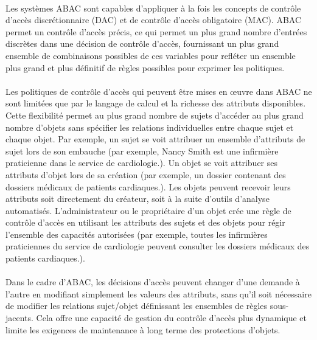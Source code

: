 \label{sectionAvantagesABAC}

\paragraph{} Les systèmes ABAC sont capables d'appliquer à la fois les concepts de contrôle d'accès discrétionnaire (DAC) et de contrôle d'accès obligatoire (MAC). ABAC permet un contrôle d'accès précis, ce qui permet un plus grand nombre d'entrées discrètes dans une décision de contrôle d'accès, fournissant un plus grand ensemble de combinaisons possibles de ces variables pour refléter un ensemble plus grand et plus définitif de règles possibles pour exprimer les politiques.
\paragraph{} Les politiques de contrôle d'accès qui peuvent être mises en œuvre dans ABAC ne sont limitées que par le langage de calcul et la richesse des attributs disponibles. Cette flexibilité permet au plus grand nombre de sujets d'accéder au plus grand nombre d'objets sans spécifier les relations individuelles entre chaque sujet et chaque objet. Par exemple, un sujet se voit attribuer un ensemble d'attributs de sujet lors de son embauche (par exemple, Nancy Smith est une infirmière praticienne dans le service de cardiologie.). Un objet se voit attribuer ses attributs d'objet lors de sa création (par exemple, un dossier contenant des dossiers médicaux de patients cardiaques.). Les objets peuvent recevoir leurs attributs soit directement du créateur, soit à la suite d'outils d'analyse automatisés. L'administrateur ou le propriétaire d'un objet crée une règle de contrôle d'accès en utilisant les attributs des sujets et des objets pour régir l'ensemble des capacités autorisées (par exemple, toutes les infirmières praticiennes du service de cardiologie peuvent consulter les dossiers médicaux des patients cardiaques.). 
\paragraph{} Dans le cadre d'ABAC, les décisions d'accès peuvent changer d'une demande à l'autre en modifiant simplement les valeurs des attributs, sans qu'il soit nécessaire de modifier les relations sujet/objet définissant les ensembles de règles sous-jacents. Cela offre une capacité de gestion du contrôle d'accès plus dynamique et limite les exigences de maintenance à long terme des protections d'objets. 

